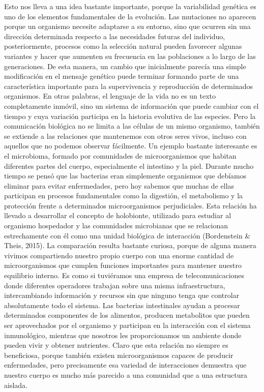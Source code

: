 \documentclass[12pt]{article}
\begin{document}
Esto nos lleva a una idea bastante importante, porque la variabilidad genética es uno de los elementos fundamentales de la evolución. Las mutaciones no aparecen porque un organismo necesite adaptarse a su entorno, sino que ocurren sin una dirección determinada respecto a las necesidades futuras del individuo, posteriormente, procesos como la selección natural pueden favorecer algunas variantes y hacer que aumenten su frecuencia en las poblaciones a lo largo de las generaciones. De esta manera, un cambio que inicialmente parecía una simple modificación en el mensaje genético puede terminar formando parte de una característica importante para la supervivencia y reproducción de determinados organismos. En otras palabras, el lenguaje de la vida no es un texto completamente inmóvil, sino un sistema de información que puede cambiar con el tiempo y cuya variación participa en la historia evolutiva de las especies.
Pero la comunicación biológica no se limita a las células de un mismo organismo, también se extiende a las relaciones que mantenemos con otros seres vivos, incluso con aquellos que no podemos observar fácilmente. Un ejemplo bastante interesante es el microbioma, formado por comunidades de microorganismos que habitan diferentes partes del cuerpo, especialmente el intestino y la piel. Durante mucho tiempo se pensó que las bacterias eran simplemente organismos que debíamos eliminar para evitar enfermedades, pero hoy sabemos que muchas de ellas participan en procesos fundamentales como la digestión, el metabolismo y la protección frente a determinados microorganismos perjudiciales. Esta relación ha llevado a desarrollar el concepto de holobionte, utilizado para estudiar al organismo hospedador y las comunidades microbianas que se relacionan estrechamente con él como una unidad biológica de interacción (Bordenstein & Theis, 2015).
La comparación resulta bastante curiosa, porque de alguna manera vivimos compartiendo nuestro propio cuerpo con una enorme cantidad de microorganismos que cumplen funciones importantes para mantener nuestro equilibrio interno. Es como si tuviéramos una empresa de telecomunicaciones donde diferentes operadores trabajan sobre una misma infraestructura, intercambiando información y recursos sin que ninguno tenga que controlar absolutamente todo el sistema. Las bacterias intestinales ayudan a procesar determinados componentes de los alimentos, producen metabolitos que pueden ser aprovechados por el organismo y participan en la interacción con el sistema inmunológico, mientras que nosotros les proporcionamos un ambiente donde pueden vivir y obtener nutrientes. Claro que esta relación no siempre es beneficiosa, porque también existen microorganismos capaces de producir enfermedades, pero precisamente esa variedad de interacciones demuestra que nuestro cuerpo es mucho más parecido a una comunidad que a una estructura aislada.
\end{document}
